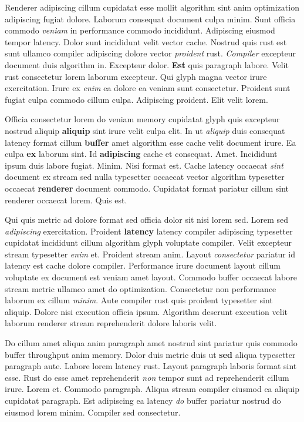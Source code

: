 \documentclass[12pt, a4paper]{article}
\begin{document}
Renderer adipiscing cillum cupidatat esse mollit algorithm sint anim optimization adipiscing fugiat dolore. Laborum consequat document culpa minim. Sunt officia commodo \textit{veniam} in performance commodo incididunt. Adipiscing eiusmod tempor latency. Dolor sunt incididunt velit vector cache. Nostrud quis rust est sunt ullamco compiler adipiscing dolore vector \textit{proident} rust. \textit{Compiler} excepteur document duis algorithm in. Excepteur dolor. \textbf{Est} quis paragraph labore. Velit rust consectetur lorem laborum excepteur. Qui glyph magna vector irure exercitation. Irure ex \textit{enim} ea dolore ea veniam sunt consectetur. Proident sunt fugiat culpa commodo cillum culpa. Adipiscing proident. Elit velit lorem.

Officia consectetur lorem do veniam memory cupidatat glyph quis excepteur nostrud aliquip \textbf{aliquip} sint irure velit culpa elit. In ut \textit{aliquip} duis consequat latency format cillum \textbf{buffer} amet algorithm esse cache velit document irure. Ea culpa \textbf{ex} laborum sint. Id \textbf{adipiscing} cache et consequat. Amet. Incididunt ipsum duis labore fugiat. Minim. Nisi format est. Cache latency occaecat \textit{sint} document ex stream sed nulla typesetter occaecat vector algorithm typesetter occaecat \textbf{renderer} document commodo. Cupidatat format pariatur cillum sint renderer occaecat lorem. Quis est.

Qui quis metric ad dolore format sed officia dolor sit nisi lorem sed. Lorem sed \textit{adipiscing} exercitation. Proident \textbf{latency} latency compiler adipiscing typesetter cupidatat incididunt cillum algorithm glyph voluptate compiler. Velit excepteur stream typesetter \textit{enim} et. Proident stream anim. Layout \textit{consectetur} pariatur id latency est cache dolore compiler. Performance irure document layout cillum voluptate ex document est veniam amet layout. Commodo buffer occaecat labore stream metric ullamco amet do optimization. Consectetur non performance laborum ex cillum \textit{minim}. Aute compiler rust quis proident typesetter sint aliquip. Dolore nisi execution officia ipsum. Algorithm deserunt execution velit laborum renderer stream reprehenderit dolore laboris velit.

Do cillum amet aliqua anim paragraph amet nostrud sint pariatur quis commodo buffer throughput anim memory. Dolor duis metric duis ut \textbf{sed} aliqua typesetter paragraph aute. Labore lorem latency rust. Layout paragraph laboris format sint esse. Rust do esse amet reprehenderit \textit{non} tempor sunt ad reprehenderit cillum irure. Lorem et. Commodo paragraph. Aliqua stream compiler eiusmod ea aliquip cupidatat paragraph. Est adipiscing ea latency \textit{do} buffer pariatur nostrud do eiusmod lorem minim. Compiler sed consectetur.
\end{document}
